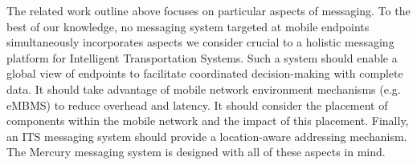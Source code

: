 The related work outline above focuses on particular aspects of
messaging.  To the best of our knowledge, no messaging system targeted
at mobile endpoints simultaneously incorporates aspects we consider
crucial to a holistic messaging platform for Intelligent
Transportation Systems.  Such a system should enable a global view of
endpoints to facilitate coordinated decision-making with complete
data. It should take advantage of mobile network environment
mechanisms (e.g. eMBMS) to reduce overhead and latency. It should
consider the placement of components within the mobile network and the
impact of this placement.  Finally, an ITS messaging system should
provide a location-aware addressing mechanism. The Mercury messaging
system is designed with all of these aspects in mind.
